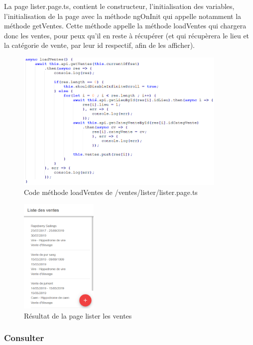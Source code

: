 					La page lister.page.ts, contient le constructeur, l'initialisation des variables, l'initialisation de la page avec la méthode ngOnInit qui appelle notamment la méthode getVentes. Cette méthode appelle la méthode loadVentes qui chargera donc les ventes, pour peux qu'il en reste à récupérer (et qui récupèrera le lieu et la catégorie de vente, par leur id respectif, afin de les afficher).

					\begin{figure}[H]
						\centering\includegraphics[width=0.9\textwidth, keepaspectratio]{res/listerTs.png}
						\caption{Code méthode loadVentes de /ventes/lister/lister.page.ts}
					\end{figure}

					\begin{figure}[H]
						\centering\includegraphics[width=0.33\textwidth, keepaspectratio]{res/listerVentes.png}
						\caption{Résultat de la page lister les ventes}
					\end{figure}

			\subsubsection{Consulter}

